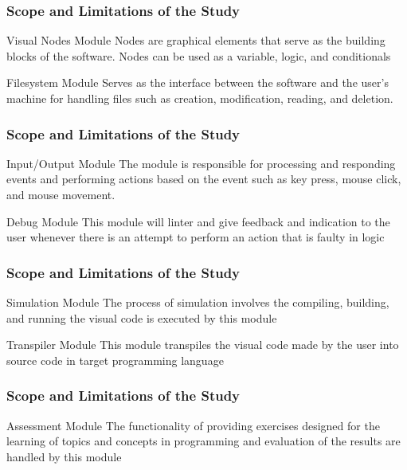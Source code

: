 \documentclass{beamer}
\begin{document}
\begin{frame}
	\frametitle{Scope and Limitations of the Study}
	\begin{block}{Visual Nodes Module}
		Nodes are graphical elements that serve as the building blocks of the
		software.  Nodes can be used as a variable, logic, and conditionals
	\end{block}
	\begin{block}{Filesystem Module}
		Serves as the interface between the software and the user’s machine for
		handling files such as creation, modification, reading, and deletion.
	\end{block}
\end{frame}

\begin{frame}
	\frametitle{Scope and Limitations of the Study}
	\begin{block}{Input/Output Module}
		The module is responsible for processing and responding events
		and performing actions based on the event such as key press, mouse click,
		and mouse movement.
	\end{block}
	\begin{block}{Debug Module}
		This module will linter and give feedback and indication to the user
		whenever there is an attempt to perform an action that is faulty in logic
	\end{block}
\end{frame}

\begin{frame}
	\frametitle{Scope and Limitations of the Study}
	\begin{block}{Simulation Module}
		The process of simulation involves the compiling, building, and running the
		visual code is executed by this module
	\end{block}
	\begin{block}{Transpiler Module}
		This module transpiles the visual code made by the user into source code in
		target programming language
	\end{block}
\end{frame}

\begin{frame}
	\frametitle{Scope and Limitations of the Study}
	\begin{block}{Assessment Module}
		The functionality of providing exercises designed for the learning of
		topics and concepts in programming and evaluation of the results are
		handled by this module
	\end{block}
\end{frame}
\end{document}
